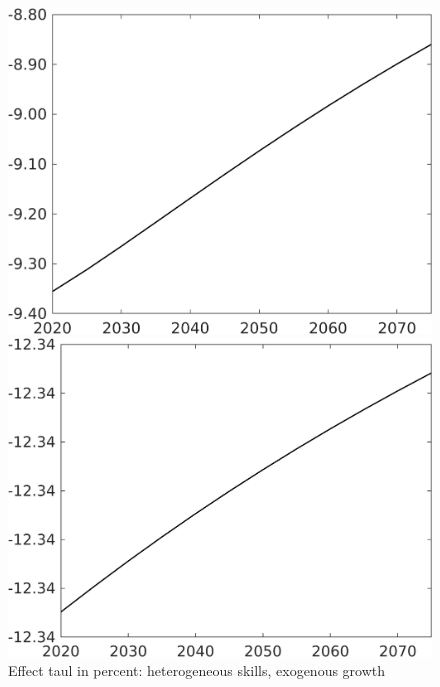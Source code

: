 \documentclass[12pt]{article}
\begin{document}
\begin{figure}[h!!]
	\centering
	\caption{Effect taul in percent: heterogeneous skills, exogenous growth }\label{fig:LF_BAU_nsk0_xgr1}
	\begin{minipage}[]{0.32\textwidth}
		\includegraphics[width=1\textwidth]{../../codding_model/own_basedOnFried/optimalPol_010922_revision/figures/all_13Sept22/CompTaul_LFBAUPer_Reg0_Emnet_spillover0_nsk0_xgr1_knspil0_sep1_countec0_GovRev0_etaa0.79.png}
	\end{minipage}	
	\begin{minipage}[]{0.32\textwidth}
		\includegraphics[width=1\textwidth]{../../codding_model/own_basedOnFried/optimalPol_010922_revision/figures/all_13Sept22/CompTaul_LFBAUPer_Reg0_hh_spillover0_nsk0_xgr1_knspil0_sep1_countec0_GovRev0_etaa0.79.png}

\end{minipage}
\end{figure}
\end{document}
